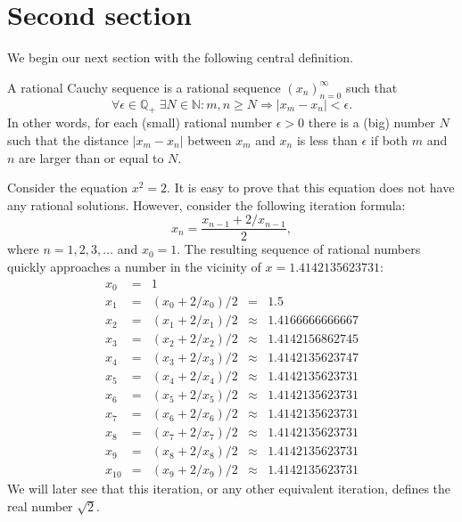 \documentclass{tstextbook}
\begin{document}
\section{Second section}

We begin our next section with the following central definition.

\begin{definition}
  \label{th:rationalcauchysequence}
  A rational Cauchy sequence is a rational sequence
  $(x_n)_{n=0}^{\infty}$ such that
  \begin{equation}
    \forall \epsilon \in \mathbb{Q}_+ \;
    \exists N \in \mathbb{N} : m, n \geq N \Rightarrow |x_m - x_n| < \epsilon.
  \end{equation}
  In other words, for each (small) rational number $\epsilon > 0$
  there is a (big) number $N$ such that the distance $|x_m - x_n|$
  between $x_m$ and $x_n$ is less than $\epsilon$ if both $m$ and $n$
  are larger than or equal to $N$.
\end{definition}



\begin{example}[Solving the equation $x^2 = 2$]
  Consider the equation $x^2 = 2$. It is easy to prove that this
  equation does not have any rational solutions. However, consider
  the following iteration formula:
  \begin{equation}
    x_n = \frac{x_{n-1} + 2 / x_{n - 1}}{2},
  \end{equation}
  where $n = 1,2,3,\ldots$ and $x_0 = 1$. The resulting sequence of
  rational numbers quickly approaches a number in the vicinity of
  $x = 1.4142135623731$:
  \begin{displaymath}
    \begin{array}{rclcl}
      x_0 &=& 1 \\
      x_{1} &=& (x_{0} + 2 / x_{0}) / 2 &=& 1.5 \\
      x_{2} &=& (x_{1} + 2 / x_{1}) / 2 &\approx& 1.4166666666667 \\
      x_{3} &=& (x_{2} + 2 / x_{2}) / 2 &\approx& 1.4142156862745 \\
      x_{4} &=& (x_{3} + 2 / x_{3}) / 2 &\approx& 1.4142135623747 \\
      x_{5} &=& (x_{4} + 2 / x_{4}) / 2 &\approx& 1.4142135623731 \\
      x_{6} &=& (x_{5} + 2 / x_{5}) / 2 &\approx& 1.4142135623731 \\
      x_{7} &=& (x_{6} + 2 / x_{6}) / 2 &\approx& 1.4142135623731 \\
      x_{8} &=& (x_{7} + 2 / x_{7}) / 2 &\approx& 1.4142135623731 \\
      x_{9} &=& (x_{8} + 2 / x_{8}) / 2 &\approx& 1.4142135623731 \\
      x_{10} &=& (x_{9} + 2 / x_{9}) / 2 &\approx& 1.4142135623731
    \end{array}
  \end{displaymath}
  We will later see that this iteration, or any other equivalent
  iteration, defines the real number $\sqrt{2}$.
\end{example}
\end{document}
